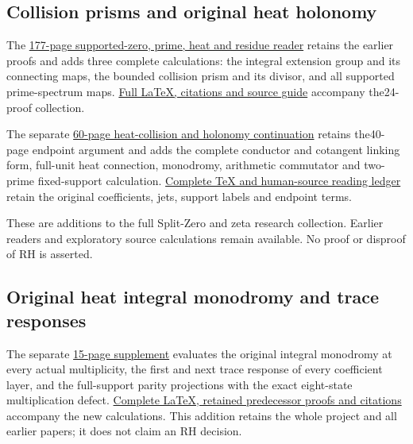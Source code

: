 \documentclass[
]{article}
\begin{document}
\subsection{Collision prisms and original heat
holonomy}\label{collision-prisms-and-original-heat-holonomy}

The
\href{https://github.com/KokunoYumeto/zeta-function-research-reader/blob/main/workbenches/splitzero-tandem/branches/tau-zero-prime-positivity/TAU_ZERO_PRIME_POSITIVITY.pdf}{177-page
supported-zero, prime, heat and residue reader} retains the earlier
proofs and adds three complete calculations: the integral extension
group and its connecting maps, the bounded collision prism and its
divisor, and all supported prime-spectrum maps.
\href{https://github.com/KokunoYumeto/zeta-function-research-reader/blob/main/workbenches/splitzero-tandem/branches/tau-zero-prime-positivity/PUBLICATION_COMPANION.md}{Full
LaTeX, citations and source guide} accompany the24-proof collection.

The separate
\href{https://github.com/KokunoYumeto/zeta-function-research-reader/blob/main/workbenches/splitzero-tandem/continuations/20260923-supported-zero-collision-holonomy/SUPPORTED_ZERO_COLLISION_HOLONOMY.pdf}{60-page
heat-collision and holonomy continuation} retains the40-page endpoint
argument and adds the complete conductor and cotangent linking form,
full-unit heat connection, monodromy, arithmetic commutator and
two-prime fixed-support calculation.
\href{https://github.com/KokunoYumeto/zeta-function-research-reader/blob/main/workbenches/splitzero-tandem/continuations/20260923-supported-zero-collision-holonomy/README.md}{Complete
TeX and human-source reading ledger} retain the original coefficients,
jets, support labels and endpoint terms.

These are additions to the full Split-Zero and zeta research collection.
Earlier readers and exploratory source calculations remain available. No
proof or disproof of RH is asserted.

\subsection{Original heat integral monodromy and trace
responses}\label{original-heat-integral-monodromy-and-trace-responses}

The separate
\href{https://github.com/KokunoYumeto/zeta-function-research-reader/blob/main/workbenches/splitzero-tandem/continuations/20260923-original-heat-integral-monodromy/ORIGINAL_HEAT_MONODROMY_AND_TRACE_RESPONSES.pdf}{15-page
supplement} evaluates the original integral monodromy at every actual
multiplicity, the first and next trace response of every coefficient
layer, and the full-support parity projections with the exact
eight-state multiplication defect.
\href{https://github.com/KokunoYumeto/zeta-function-research-reader/blob/main/workbenches/splitzero-tandem/continuations/20260923-original-heat-integral-monodromy/README.md}{Complete
LaTeX, retained predecessor proofs and citations} accompany the new
calculations. This addition retains the whole project and all earlier
papers; it does not claim an RH decision.
\end{document}
